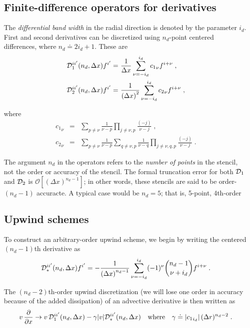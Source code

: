 \subsection{Finite-difference operators for derivatives}

The {\sl differential band width} in the radial direction is denoted 
by the parameter $i_d$.  First and second derivatives can be  
discretized using $n_d$-point centered differences, where 
$n_d \doteq 2 i_d + 1$.  These are
%
\begin{align}
{\cal D}_1^{i{i^\prime}}(n_d,\Delta x) f^{i^\prime} = &~\frac{1}{\Delta x} 
 \sum_{\nu=-i_d}^{i_d} {c_1}_\nu f^{i+\nu} \; , \\ 
{\cal D}_2^{i{i^\prime}}(n_d,\Delta x) f^{i^\prime} = &~\frac{1}{{(\Delta x)}^2}
 \sum_{\nu=-i_d}^{i_d} {c_2}_\nu f^{i+\nu} \; ,
\end{align}

\noindent
where
%
\begin{eqnarray}
{c_1}_\nu & = & \sum_{p \neq \nu} \frac{1}{\nu-p}
\prod_{j \neq \nu,p} \frac{(-j)}{\nu-j} \; , \\
{c_2}_\nu & = & \sum_{p \neq \nu} \frac{1}{\nu-p}
\sum_{q \neq \nu,p} \frac{1}{\nu-q}
\prod_{j \neq \nu,q,p} \frac{(-j)}{\nu-j} \; .
\end{eqnarray}

\noindent
The argument $n_d$ in the operators refers to the {\it number of points} 
in the stencil, not the order or accuracy of the stencil.  The formal 
truncation error for both ${\cal D}_1$ and ${\cal D}_2$ is 
${\mathcal O}\left[(\Delta x)^{n_d-1}\right]$; in other words, 
these stencils are said to be order-$(n_d-1)$ accuracte.  A typical 
case would be $n_d=5$; that is, 5-point, 4th-order 

\subsection{Upwind schemes}

To construct an arbitrary-order upwind scheme, we begin by writing 
the centered $(n_d-1)$th derivative as
%
\begin{equation}
{\cal D}_*^{i{i^\prime}}(n_d,\Delta x) f^{i^\prime} = - \frac{1}{{(\Delta x)}^{n_d-1}} 
\sum_{\nu=-i_d}^{i_d} (-1)^{\nu} \binom{n_d-1}{\nu+i_d} f^{i+\nu} \; .
\end{equation}

\noindent
The $(n_d-2)$th-order upwind discretization (we will lose one order 
in accuracy because of the added dissipation) of an advective 
derivative is then written as
%
\begin{equation}
v \, \frac{\partial}{\partial x} \rightarrow 
v \, {\cal D}_1^{i{i^\prime}}(n_d,\Delta x) 
- \gamma |v| {\cal D}_*^{i{i^\prime}}(n_d,\Delta x) \quad\hbox{where}\quad
\gamma \doteq | {c_1}_{i_d} | \, (\Delta r)^{n_d-2} \; .
\label{eq.upwind}
\end{equation}

